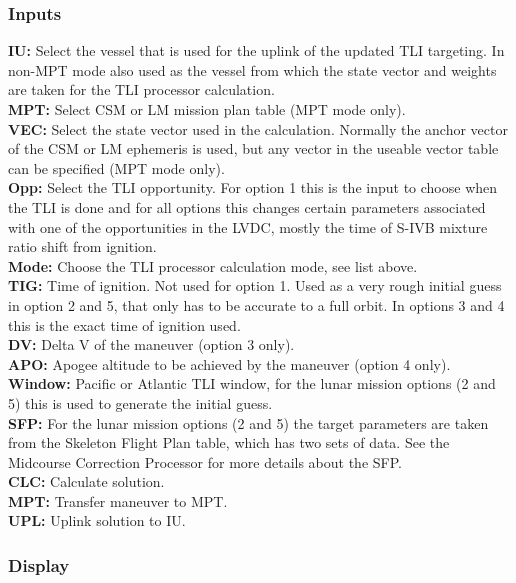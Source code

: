 \documentclass[11pt]{article} %
\begin{document}
\subsubsection{Inputs}
\textbf{IU:} Select the vessel that is used for the uplink of the updated TLI targeting. In non-MPT mode also used as the vessel from which the state vector and weights are taken for the TLI processor calculation.\\
\textbf{MPT:} Select CSM or LM mission plan table (MPT mode only).\\
\textbf{VEC:} Select the state vector used in the calculation. Normally the anchor vector of the CSM or LM ephemeris is used, but any vector in the useable vector table can be specified (MPT mode only).\\
\textbf{Opp:} Select the TLI opportunity. For option 1 this is the input to choose when the TLI is done and for all options this changes certain parameters associated with one of the opportunities in the LVDC, mostly the time of S-IVB mixture ratio shift from ignition.\\
\textbf{Mode:} Choose the TLI processor calculation mode, see list above.\\
\textbf{TIG:} Time of ignition. Not used for option 1. Used as a very rough initial guess in option 2 and 5, that only has to be accurate to a full orbit. In options 3 and 4 this is the exact time of ignition used.\\
\textbf{DV:} Delta V of the maneuver (option 3 only).\\
\textbf{APO:} Apogee altitude to be achieved by the maneuver (option 4 only).\\
\textbf{Window:} Pacific or Atlantic TLI window, for the lunar mission options (2 and 5) this is used to generate the initial guess.\\
\textbf{SFP:} For the lunar mission options (2 and 5) the target parameters are taken from the Skeleton Flight Plan table, which has two sets of data. See the Midcourse Correction Processor for more details about the SFP.\\

\textbf{CLC:} Calculate solution.\\
\textbf{MPT:} Transfer maneuver to MPT.\\
\textbf{UPL:} Uplink solution to IU.\\
\newpage
\subsubsection{Display}
\end{document}
